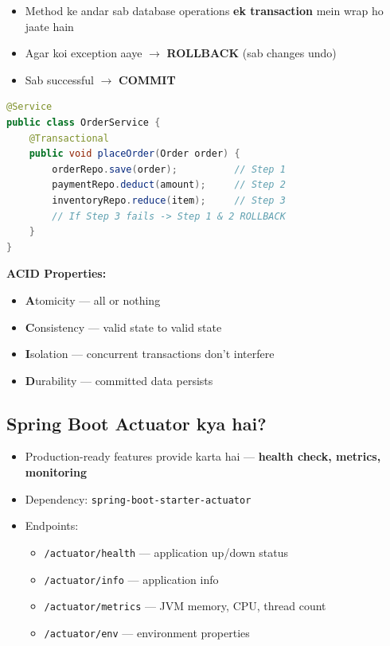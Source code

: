 \documentclass[12pt,a4paper]{article}
\begin{document}
\begin{answerbox}
\begin{itemize}
    \item Method ke andar sab database operations \textbf{ek transaction} mein wrap ho jaate hain
    \item Agar koi exception aaye $\rightarrow$ \textbf{ROLLBACK} (sab changes undo)
    \item Sab successful $\rightarrow$ \textbf{COMMIT}
\end{itemize}
\begin{lstlisting}[language=Java]
@Service
public class OrderService {
    @Transactional
    public void placeOrder(Order order) {
        orderRepo.save(order);          // Step 1
        paymentRepo.deduct(amount);     // Step 2
        inventoryRepo.reduce(item);     // Step 3
        // If Step 3 fails -> Step 1 & 2 ROLLBACK
    }
}
\end{lstlisting}
\textbf{ACID Properties:}
\begin{itemize}
    \item \textbf{A}tomicity --- all or nothing
    \item \textbf{C}onsistency --- valid state to valid state
    \item \textbf{I}solation --- concurrent transactions don't interfere
    \item \textbf{D}urability --- committed data persists
\end{itemize}
\end{answerbox}

\subsection{Spring Boot Actuator kya hai?}

\begin{answerbox}
\begin{itemize}
    \item Production-ready features provide karta hai --- \textbf{health check, metrics, monitoring}
    \item Dependency: \texttt{spring-boot-starter-actuator}
    \item Endpoints:
    \begin{itemize}
        \item \texttt{/actuator/health} --- application up/down status
        \item \texttt{/actuator/info} --- application info
        \item \texttt{/actuator/metrics} --- JVM memory, CPU, thread count
        \item \texttt{/actuator/env} --- environment properties
    \end{itemize}
\end{itemize}
\end{answerbox}
\end{document}
